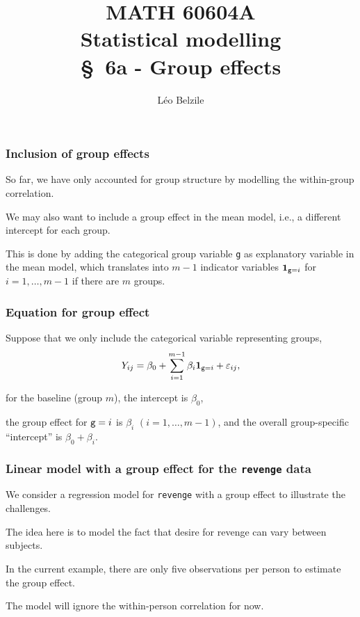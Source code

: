 \documentclass{beamer}
\title[\color{white}{MATH 60604A \S~6a - Group effects}]{\texorpdfstring{MATH 60604A \\Statistical modelling \\ \S~6a - Group effects}{MATH 60604A \\Statistical modelling \\ \S~6a - Group effects}}
\author{Léo Belzile}
\institute{HEC Montréal\\
Department of Decision Sciences}
\date{}
\begin{document}
\frame{\titlepage}
\begin{frame}
 \frametitle{Inclusion of group effects}
 \bi 
 \item So far, we have only accounted for group structure by modelling the within-group correlation.
 \item We may also want to include a \alert{group effect} in the mean model, i.e., a different intercept for each group.
 \item This is done by adding the categorical group variable \texttt{g} as explanatory variable in the mean model, which translates into $m-1$ indicator variables ${\mathbf 1}_{\texttt{g}=i}$ for $i=1, \ldots, m-1$ if there are $m$ groups. 
 \ei
 \end{frame}
 \begin{frame}
 \frametitle{Equation for group effect}
 \bi
 \item Suppose that we only include the categorical variable  representing groups,
 \[ Y_{ij}= \beta_0 + \sum_{i=1}^{m-1} \beta_i{\mathbf 1}_{\texttt{g}=i} + \varepsilon_{ij},\]
 \bi \item for the baseline (group $m$), the intercept is $\beta_0$,
 \item the group effect for $\texttt{g}=i$ is $\beta_i$ $(i=1, \ldots, m-1)$, and the overall group-specific ``intercept'' is $\beta_0+ \beta_i$.
 \ei
 \ei
 
 \end{frame}
 
\begin{frame}
\frametitle{Linear model with a group effect for the \texttt{revenge} data}
We consider a regression model for \texttt{revenge} with a group effect to illustrate the challenges.
\bi
\item The idea here is to model the fact that desire for revenge can vary between subjects.
\item In the current example, there are only five observations per person to estimate the group effect.
\item The model will ignore the within-person correlation for now.
\ei
\end{frame}
\end{document}
